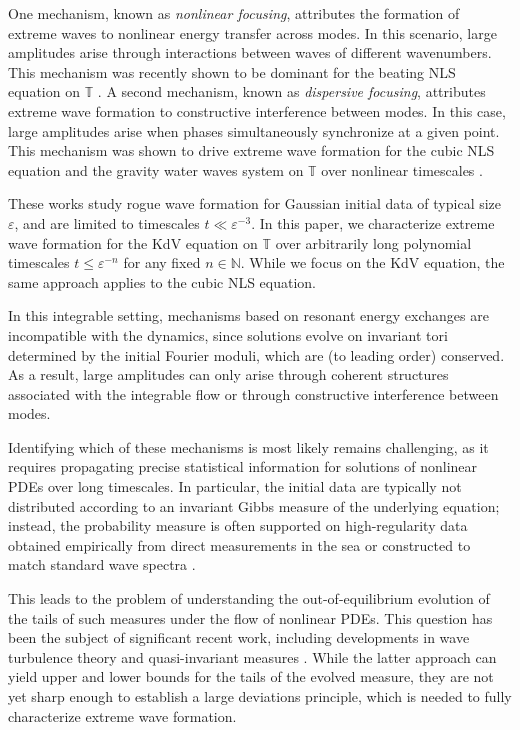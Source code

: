 \documentclass[a4paper,10pt,reqno]{article}
\theoremstyle{definition}
\theoremstyle{plain}
\theoremstyle{plain}
\theoremstyle{definition}
\theoremstyle{plain}
\theoremstyle{plain}
\theoremstyle{plain}
\theoremstyle{definition}
\theoremstyle{definition}
\def \N{\mathbb N}
\def \T{\mathbb{T}}
\begin{document}
\smallskip

One mechanism, known as \emph{nonlinear focusing}, attributes the formation of extreme waves to nonlinear energy transfer across modes. In this scenario, large amplitudes arise through interactions between waves of different wavenumbers. This mechanism was recently shown to be dominant for the beating NLS equation on $\T$ \cite{grande2}.
A second mechanism, known as \emph{dispersive focusing}, attributes extreme wave formation to constructive interference between modes. In this case, large amplitudes arise when phases simultaneously synchronize at a given point. This mechanism was shown to drive extreme wave formation for the cubic NLS equation and the gravity water waves system on $\T$ over nonlinear timescales \cite{bertimasperograndestaffilani,grande}.

\smallskip

These works study rogue wave formation for Gaussian initial data of typical size $\varepsilon$, and are limited to  timescales $t \ll \varepsilon^{-3}$. In this paper, we characterize extreme wave formation for the KdV equation on $\T$ over arbitrarily long polynomial timescales $t \leq \varepsilon^{-n}$ for any fixed $n \in \N$. While we focus on the KdV equation, the same approach applies to the cubic NLS equation.

\smallskip

In this integrable setting, mechanisms based on resonant energy exchanges are incompatible with the dynamics, since solutions evolve on invariant tori determined by the initial Fourier moduli, which are (to leading order) conserved. As a result, large amplitudes can only arise through coherent structures associated with the integrable flow or through constructive interference between modes.

\smallskip

Identifying which of these mechanisms is most likely remains challenging, as it requires propagating precise statistical information for solutions of nonlinear PDEs over long timescales. In particular, the initial data are typically not distributed according to an invariant Gibbs measure of the underlying equation; instead, the probability measure is often supported on high-regularity data obtained empirically from direct measurements in the sea \cite{data1,data2} or constructed to match standard wave spectra \cite{jonswap}.

\smallskip

This leads to the problem of understanding the out-of-equilibrium evolution of the tails of such measures under the flow of nonlinear PDEs. This question has been the subject of significant recent work, including developments in wave turbulence theory \cite{denghani,DIP,grandehani} and quasi-invariant measures \cite{ohtzvetkov,Tzvetkov}. While the latter approach can yield upper and lower bounds for the tails of the evolved measure, they are not yet sharp enough to establish a large deviations principle, which is needed to fully characterize extreme wave formation.
\end{document}
